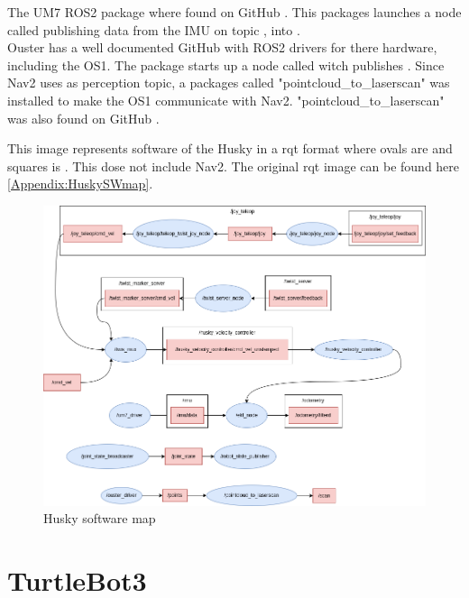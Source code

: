 The UM7 ROS2 package where found on GitHub \cite{um7imu}. This packages launches a node called  publishing data from the IMU on topic , into .
\\ \newline
Ouster has a well documented GitHub \cite{ousterros} with ROS2 drivers for there hardware, including the OS1. The package starts up a node called  witch publishes . 
Since Nav2 uses  as perception topic, a packages called "pointcloud\_to\_laserscan" \cite{pcl2laser} was installed to make the OS1 communicate with Nav2. "pointcloud\_to\_laserscan" was also found on GitHub . 

This image represents software of the Husky in a rqt format where 
ovals are  and squares is . This dose not include Nav2. The original rqt image can be found here \ref{Appendix:HuskySWmap}. 

\begin{figure}[H]
    \centering
    \includegraphics[width = 1\textwidth]{Figures/drawio/husky_rqt.drawio.png}
    \caption{Husky software map}
    \label{fig:HuskySW}
\end{figure}

\section{TurtleBot3}
